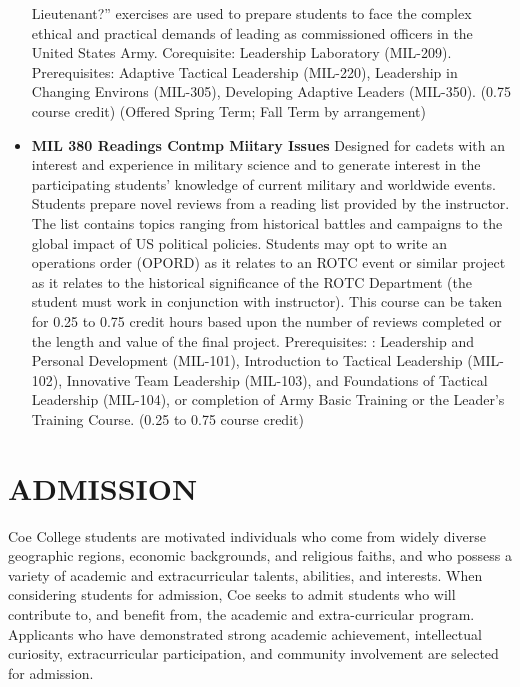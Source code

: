 \documentclass[
  letterpaper,
]{scrbook}
\renewcommand{\part}[1]{\addcontentsline{toc}{part}{#1}}
\begin{document}
\begin{itemize}
  Lieutenant?'' exercises are used to prepare students to face the
  complex ethical and practical demands of leading as commissioned
  officers in the United States Army. Corequisite: Leadership Laboratory
  (MIL-209). Prerequisites: Adaptive Tactical Leadership (MIL-220),
  Leadership in Changing Environs (MIL-305), Developing Adaptive Leaders
  (MIL-350). (0.75 course credit) (Offered Spring Term; Fall Term by
  arrangement)
\item
  \textbf{MIL 380 Readings Contmp Miitary Issues} Designed for cadets
  with an interest and experience in military science and to generate
  interest in the participating students' knowledge of current military
  and worldwide events. Students prepare novel reviews from a reading
  list provided by the instructor. The list contains topics ranging from
  historical battles and campaigns to the global impact of US political
  policies. Students may opt to write an operations order (OPORD) as it
  relates to an ROTC event or similar project as it relates to the
  historical significance of the ROTC Department (the student must work
  in conjunction with instructor). This course can be taken for 0.25 to
  0.75 credit hours based upon the number of reviews completed or the
  length and value of the final project. Prerequisites: : Leadership and
  Personal Development (MIL-101), Introduction to Tactical Leadership
  (MIL-102), Innovative Team Leadership (MIL-103), and Foundations of
  Tactical Leadership (MIL-104), or completion of Army Basic Training or
  the Leader's Training Course. (0.25 to 0.75 course credit)
\end{itemize}

\part{ADMISSIONS}

\chapter{ADMISSION}\label{admission}

Coe College students are motivated individuals who come from widely
diverse geographic regions, economic backgrounds, and religious faiths,
and who possess a variety of academic and extracurricular talents,
abilities, and interests. When considering students for admission, Coe
seeks to admit students who will contribute to, and benefit from, the
academic and extra-curricular program. Applicants who have demonstrated
strong academic achievement, intellectual curiosity, extracurricular
participation, and community involvement are selected for admission.
\end{document}
